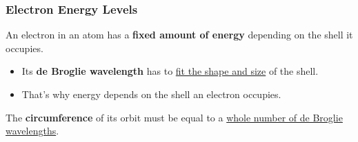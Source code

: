 \subsubsection*{Electron Energy Levels}

An electron in an atom has a \textbf{fixed amount of energy} depending on the shell it occupies.
\begin{itemize}
    \item Its \textbf{de Broglie wavelength} has to \underline{fit the shape and size} of the shell.
    \item That's why energy depends on the shell an electron occupies.
\end{itemize}
The \textbf{circumference} of its orbit must be equal to a \underline{whole number of de Broglie wavelengths}.
